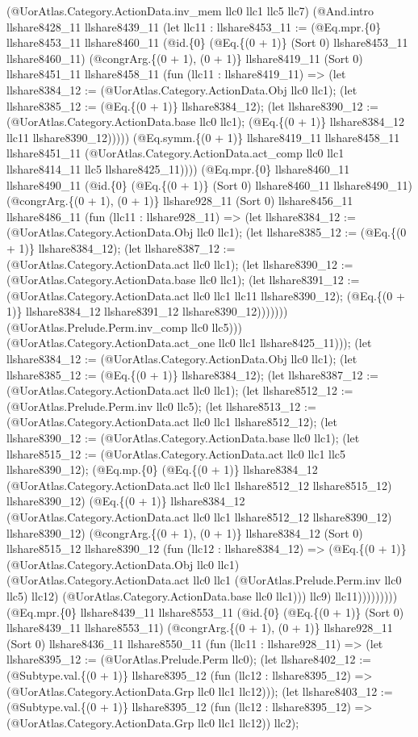 \documentclass[11pt]{article}
\begin{document}
(@UorAtlas.Category.ActionData.inv\_mem llc0 llc1 llc5 llc7) (@And.intro llshare8428\_11 llshare8439\_11 (let llc11 : llshare8453\_11 := (@Eq.mpr.\{0\} llshare8453\_11 llshare8460\_11 (@id.\{0\} (@Eq.\{(0 + 1)\} (Sort 0) llshare8453\_11 llshare8460\_11) (@congrArg.\{(0 + 1), (0 + 1)\} llshare8419\_11 (Sort 0) llshare8451\_11 llshare8458\_11 (fun (llc11 : llshare8419\_11) => (let llshare8384\_12 := (@UorAtlas.Category.ActionData.Obj llc0 llc1); (let llshare8385\_12 := (@Eq.\{(0 + 1)\} llshare8384\_12); (let llshare8390\_12 := (@UorAtlas.Category.ActionData.base llc0 llc1); (@Eq.\{(0 + 1)\} llshare8384\_12 llc11 llshare8390\_12))))) (@Eq.symm.\{(0 + 1)\} llshare8419\_11 llshare8458\_11 llshare8451\_11 (@UorAtlas.Category.ActionData.act\_comp llc0 llc1 llshare8414\_11 llc5 llshare8425\_11)))) (@Eq.mpr.\{0\} llshare8460\_11 llshare8490\_11 (@id.\{0\} (@Eq.\{(0 + 1)\} (Sort 0) llshare8460\_11 llshare8490\_11) (@congrArg.\{(0 + 1), (0 + 1)\} llshare928\_11 (Sort 0) llshare8456\_11 llshare8486\_11 (fun (llc11 : llshare928\_11) => (let llshare8384\_12 := (@UorAtlas.Category.ActionData.Obj llc0 llc1); (let llshare8385\_12 := (@Eq.\{(0 + 1)\} llshare8384\_12); (let llshare8387\_12 := (@UorAtlas.Category.ActionData.act llc0 llc1); (let llshare8390\_12 := (@UorAtlas.Category.ActionData.base llc0 llc1); (let llshare8391\_12 := (@UorAtlas.Category.ActionData.act llc0 llc1 llc11 llshare8390\_12); (@Eq.\{(0 + 1)\} llshare8384\_12 llshare8391\_12 llshare8390\_12))))))) (@UorAtlas.Prelude.Perm.inv\_comp llc0 llc5))) (@UorAtlas.Category.ActionData.act\_one llc0 llc1 llshare8425\_11))); (let llshare8384\_12 := (@UorAtlas.Category.ActionData.Obj llc0 llc1); (let llshare8385\_12 := (@Eq.\{(0 + 1)\} llshare8384\_12); (let llshare8387\_12 := (@UorAtlas.Category.ActionData.act llc0 llc1); (let llshare8512\_12 := (@UorAtlas.Prelude.Perm.inv llc0 llc5); (let llshare8513\_12 := (@UorAtlas.Category.ActionData.act llc0 llc1 llshare8512\_12); (let llshare8390\_12 := (@UorAtlas.Category.ActionData.base llc0 llc1); (let llshare8515\_12 := (@UorAtlas.Category.ActionData.act llc0 llc1 llc5 llshare8390\_12); (@Eq.mp.\{0\} (@Eq.\{(0 + 1)\} llshare8384\_12 (@UorAtlas.Category.ActionData.act llc0 llc1 llshare8512\_12 llshare8515\_12) llshare8390\_12) (@Eq.\{(0 + 1)\} llshare8384\_12 (@UorAtlas.Category.ActionData.act llc0 llc1 llshare8512\_12 llshare8390\_12) llshare8390\_12) (@congrArg.\{(0 + 1), (0 + 1)\} llshare8384\_12 (Sort 0) llshare8515\_12 llshare8390\_12 (fun (llc12 : llshare8384\_12) => (@Eq.\{(0 + 1)\} (@UorAtlas.Category.ActionData.Obj llc0 llc1) (@UorAtlas.Category.ActionData.act llc0 llc1 (@UorAtlas.Prelude.Perm.inv llc0 llc5) llc12) (@UorAtlas.Category.ActionData.base llc0 llc1))) llc9) llc11))))))))) (@Eq.mpr.\{0\} llshare8439\_11 llshare8553\_11 (@id.\{0\} (@Eq.\{(0 + 1)\} (Sort 0) llshare8439\_11 llshare8553\_11) (@congrArg.\{(0 + 1), (0 + 1)\} llshare928\_11 (Sort 0) llshare8436\_11 llshare8550\_11 (fun (llc11 : llshare928\_11) => (let llshare8395\_12 := (@UorAtlas.Prelude.Perm llc0); (let llshare8402\_12 := (@Subtype.val.\{(0 + 1)\} llshare8395\_12 (fun (llc12 : llshare8395\_12) => (@UorAtlas.Category.ActionData.Grp llc0 llc1 llc12))); (let llshare8403\_12 := (@Subtype.val.\{(0 + 1)\} llshare8395\_12 (fun (llc12 : llshare8395\_12) => (@UorAtlas.Category.ActionData.Grp llc0 llc1 llc12)) llc2); 
\end{document}
